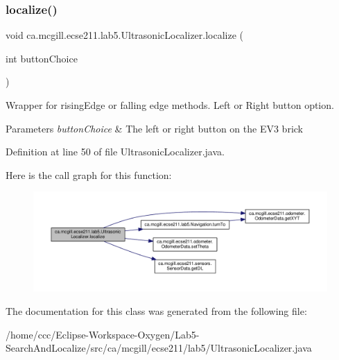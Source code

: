 \subsubsection{\texorpdfstring{localize()}{localize()}}
{\footnotesize\ttfamily void ca.\+mcgill.\+ecse211.\+lab5.\+Ultrasonic\+Localizer.\+localize (\begin{DoxyParamCaption}\item[{int}]{button\+Choice }\end{DoxyParamCaption})}

Wrapper for rising\+Edge or falling edge methods. Left or Right button option.


\begin{DoxyParams}{Parameters}
{\em button\+Choice} & The left or right button on the E\+V3 brick \\
\hline
\end{DoxyParams}


Definition at line 50 of file Ultrasonic\+Localizer.\+java.

Here is the call graph for this function\+:\nopagebreak
\begin{figure}[H]
\begin{center}
\leavevmode
\includegraphics[width=350pt]{classca_1_1mcgill_1_1ecse211_1_1lab5_1_1_ultrasonic_localizer_a7fd82ab7240a07ae6947313c0769d4bc_cgraph}
\end{center}
\end{figure}


The documentation for this class was generated from the following file\+:\begin{DoxyCompactItemize}
\item 
/home/ccc/\+Eclipse-\/\+Workspace-\/\+Oxygen/\+Lab5-\/\+Search\+And\+Localize/src/ca/mcgill/ecse211/lab5/Ultrasonic\+Localizer.\+java\end{DoxyCompactItemize}
